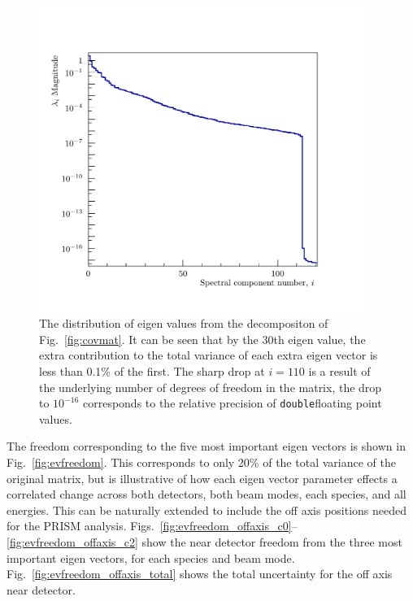 \documentclass{article}
\begin{document}
\begin{figure}
  \centering
  \includegraphics[width=0.95\textwidth]{plots/allpca_evs}
  \caption{The distribution of eigen values from the decompositon of Fig.~\ref{fig:covmat}. It can be seen that by the 30th eigen value, the extra contribution to the total variance of each extra eigen vector is less than 0.1\% of the first. The sharp drop at $i=110$ is a result of the underlying number of degrees of freedom in the matrix, the drop to $10^{-16}$ corresponds to the relative precision of \texttt{double}floating point values.}
  \label{fig:evdist}
\end{figure}

The freedom corresponding to the five most important eigen vectors is shown in Fig.~\ref{fig:evfreedom}. This corresponds to only 20\% of the total variance of the original matrix, but is illustrative of how each eigen vector parameter effects a correlated change across both detectors, both beam modes, each species, and all energies. This can be naturally extended to include the off axis positions needed for the PRISM analysis. Figs.~\ref{fig:evfreedom_offaxis_c0}--\ref{fig:evfreedom_offaxis_c2} show the near detector freedom from the three most important eigen vectors, for each species and beam mode.
Fig.~\ref{fig:evfreedom_offaxis_total} shows the total uncertainty for the off axis near detector.
\end{document}
